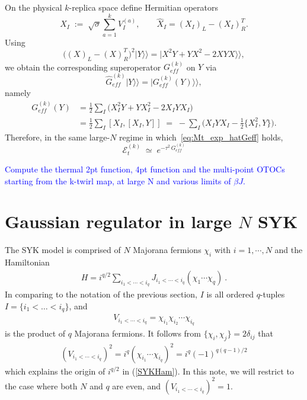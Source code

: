 \documentclass{article}
\theoremstyle{definition}
\newcommand{\NL}[1]{\textcolor{blue}{#1}}
\begin{document}
    On the physical $k$-replica space define Hermitian operators
    \begin{equation}
        X_{I}\;:=\;\sqrt{\sigma}\sum_{a=1}^{k}V_{I}^{(a)}, \qquad \widehat X_{I}=
        (X_{I})_{L}- (X_{I})_{R}^{T}.
    \end{equation}
    Using
    \begin{equation}
        \big((X)_{L}-(X)_{R}^{T}\big)^{2}|Y\rangle\rangle = |X^{2}Y+Y X^{2}-2XYX\rangle
        \rangle,
    \end{equation}
    we obtain the corresponding superoperator $G_{eff}^{(k)}$ on $Y$ via
    \begin{equation}
        \widehat G_{eff}^{(k)}|Y\rangle\rangle = |G_{eff}^{(k)}(Y)\rangle\rangle,
    \end{equation}
    namely
    \begin{align}
        G_{eff}^{(k)}(Y) & =\frac{1}{2}\sum_{I}\Big(X_{I}^{2}Y+Y X_{I}^{2}-2X_{I}Y X_{I}\Big) \nonumber                                                 \\
                         & =\frac{1}{2}\sum_{I}[X_{I},[X_{I},Y]] \;=\;-\sum_{I}\Big(X_{I}Y X_{I}-\tfrac12\{X_{I}^{2},Y\}\Big). \label{eq:Geff_quenched}
    \end{align}
    Therefore, in the same large-$N$ regime in which~\eqref{eq:Mt_exp_hatGeff} holds,
    \begin{equation}
        \boxed{\mathcal{E}_t^{(k)} \;\simeq\; e^{-\tau^2\,G_{eff}^{(k)}}}
    \end{equation}

    \NL{Compute the thermal 2pt function, 4pt function and the multi-point OTOCs starting from the k-twirl map, at large N and various limits of $\beta J$.}

    \section{Gaussian regulator in large $N$ SYK}

    The SYK model is comprised of $N$ Majorana fermions $\chi_{i}$ with
    $i=1,\cdots , N$ and the Hamiltonian
    \begin{eqnarray}
        H=i^{q/2}\sum_{i_1<\cdots <i_q}J_{i_1<\cdots<i_q} (\chi_1\cdots \chi_q)\ .
    \end{eqnarray}
    In comparing to the notation of the previous section, $I$ is all ordered $q$-tuples
    $I = \{i_{1}< \dots < i_{q}\}$, and
    \begin{eqnarray}
        V_{i_1<\cdots <i_q}=\chi_{i_1}\chi_{i_2}\cdots \chi_{i_q}
    \end{eqnarray}
    is the product of $q$ Majorana fermions. It follows from $\{\chi_{i},\chi_{j}
    \}=2\delta_{ij}$ that
    \begin{eqnarray}
        (V_{i_1<\cdots <i_q})^2=i^q(\chi_{i_1}\cdots \chi_{i_q})^2=i^q(-1)^{q(q-1)/2}
    \end{eqnarray}
    which explains the origin of $i^{q/2}$ in (\ref{SYKHam}). In this note, we will
    restrict to the case where both $N$ and $q$ are even, and
    $(V_{i_1<\cdots <i_q})^{2}=1$.
\end{document}

